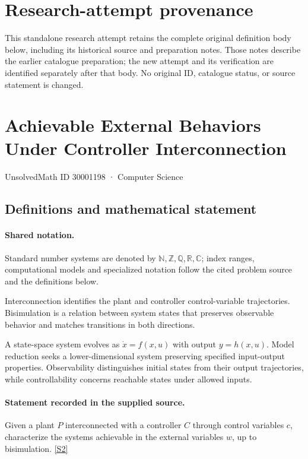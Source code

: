 \documentclass[11pt]{article}
\begin{document}
\section*{Research-attempt provenance}
This standalone research attempt retains the complete original definition body below,
including its historical source and preparation notes. Those notes describe the
earlier catalogue preparation; the new attempt and its verification are identified
separately after that body. No original ID, catalogue status, or source statement is changed.

\section{Achievable External Behaviors Under Controller Interconnection}\label{30001198}
{\small UnsolvedMath ID 30001198 · Computer Science}
\subsection{Definitions and mathematical statement}

\paragraph{Shared notation.}Standard number systems are denoted by $\mathbb N,\mathbb Z,\mathbb Q,\mathbb R,\mathbb C$; index ranges, computational models and specialized notation follow the cited problem source and the definitions below.


Interconnection identifies the plant and controller control-variable trajectories. Bisimulation is a relation between system states that preserves observable behavior and matches transitions in both directions.

A state-space system evolves as $\dot x=f(x,u)$ with output $y=h(x,u)$. Model reduction seeks a lower-dimensional system preserving specified input-output properties. Observability distinguishes initial states from their output trajectories, while controllability concerns reachable states under allowed inputs.
\paragraph{Statement recorded in the supplied source.}
Given a plant $P$ interconnected with a controller $C$ through control variables $c$, characterize the systems achievable in the external variables $w$, up to bisimulation. \href{https://doi.org/10.4171/owr/2009/11}{[S2]}
\end{document}
